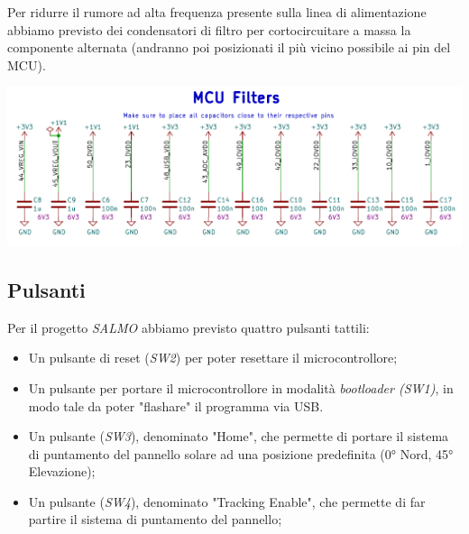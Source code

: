 \noindent Per ridurre il rumore ad alta frequenza presente sulla linea di
alimentazione abbiamo previsto dei condensatori di filtro per
cortocircuitare a massa la componente alternata (andranno poi
posizionati il più vicino possibile ai pin del MCU).

\begin{center}
\includegraphics[scale=0.55]{figures/image23.png}
\captionsetup{type=figure}
\end{center}

\hypertarget{pulsanti}{%
\subsection{\texorpdfstring{Pulsanti}{ Pulsanti}}\label{pulsanti}}

Per il progetto \emph{SALMO} abbiamo previsto quattro pulsanti tattili:

\begin{itemize}
\item
  
  Un pulsante di reset (\emph{SW2}) per poter resettare il
  microcontrollore;
  
\item
  
  Un pulsante per portare il microcontrollore in modalità
  \emph{bootloader (SW1)}, in modo tale da poter "flashare" il
  programma via USB.
  
\item
  
  Un pulsante (\emph{SW3}), denominato "Home", che permette di portare
  il sistema di puntamento del pannello solare ad una posizione
  predefinita (0° Nord, 45° Elevazione);
  
\item
  
  Un pulsante (\emph{SW4}), denominato "Tracking Enable", che permette
  di far partire il sistema di puntamento del pannello;
  
\end{itemize}

